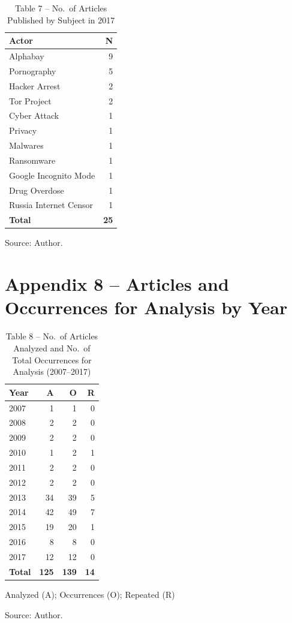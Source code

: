 \begin{table}[h!]
\centering
\caption*{Table 7 -- No.\ of Articles Published by Subject in 2017}
\begin{tabular}{lr}
\toprule
\textbf{Actor} & \textbf{N} \\
\midrule
Alphabay & 9 \\
Pornography & 5 \\
Hacker Arrest & 2 \\
Tor Project & 2 \\
Cyber Attack & 1 \\
Privacy & 1 \\
Malwares & 1 \\
Ransomware & 1 \\
Google Incognito Mode & 1 \\
Drug Overdose & 1 \\
Russia Internet Censor & 1 \\
\midrule
\textbf{Total} & \textbf{25} \\
\bottomrule
\end{tabular}

\vspace{0.5em}
\noindent Source: Author.
\end{table}

\newpage

\section*{Appendix 8 -- Articles and Occurrences for Analysis by Year}

\begin{table}[h!]
\centering
\caption*{Table 8 -- No.\ of Articles Analyzed and No.\ of Total Occurrences for Analysis (2007--2017)}
\begin{tabular}{lrrr}
\toprule
\textbf{Year} & \textbf{A} & \textbf{O} & \textbf{R} \\
\midrule
2007 & 1 & 1 & 0 \\
2008 & 2 & 2 & 0 \\
2009 & 2 & 2 & 0 \\
2010 & 1 & 2 & 1 \\
2011 & 2 & 2 & 0 \\
2012 & 2 & 2 & 0 \\
2013 & 34 & 39 & 5 \\
2014 & 42 & 49 & 7 \\
2015 & 19 & 20 & 1 \\
2016 & 8 & 8 & 0 \\
2017 & 12 & 12 & 0 \\
\midrule
\textbf{Total} & \textbf{125} & \textbf{139} & \textbf{14} \\
\bottomrule
\end{tabular}

\vspace{0.5em}
\noindent *Analyzed (A); Occurrences (O); Repeated (R)

\vspace{0.3em}
\noindent Source: Author.
\end{table}

